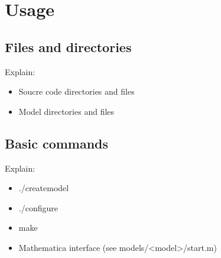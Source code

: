 \section{Usage}
\subsection{Files and directories}

Explain:
\begin{itemize}
\item Soucre code directories and files
\item Model directories and files
\end{itemize}

\subsection{Basic commands}

Explain:
\begin{itemize}
\item ./createmodel
\item ./configure
\item make
\item Mathematica interface (see models/<model>/start.m)
\end{itemize}

\subsubsection{}

